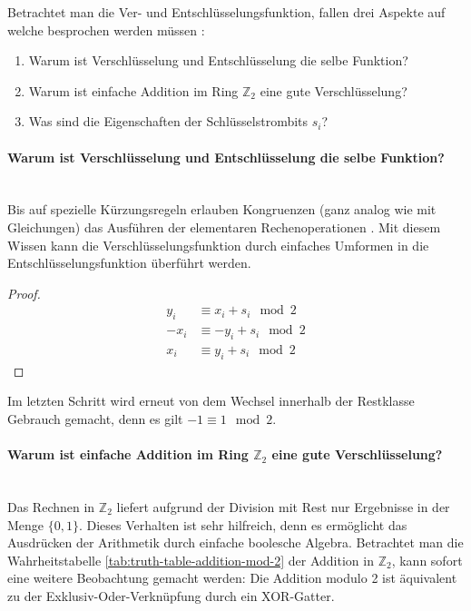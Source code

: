 \noindent
Betrachtet man die Ver- und Entschlüsselungsfunktion, fallen drei Aspekte auf welche
besprochen werden müssen \parencite[31-34]{BOOK:crypto}:

\begin{enumerate}[itemsep = 0pt]
  \item Warum ist Verschlüsselung und Entschlüsselung die selbe Funktion?
  \item Warum ist einfache Addition im Ring $\mathbb{Z}_2$ eine gute Verschlüsselung?
  \item Was sind die Eigenschaften der Schlüsselstrombits $s_i$?
\end{enumerate}

\paragraph{Warum ist Verschlüsselung und Entschlüsselung die selbe Funktion?}\mbox{}\\
Bis auf spezielle Kürzungsregeln erlauben Kongruenzen (ganz analog wie mit Gleichungen)
das Ausführen der elementaren Rechenoperationen \parencite[181-183]{BOOK:numberTheory}.
Mit diesem Wissen kann die Verschlüsselungsfunktion durch einfaches Umformen in die
Entschlüsselungsfunktion überführt werden.
\begin{proof}
  \begin{align*}
    y_i  & \equiv x_i + s_i \mod{2}  \\
    -x_i & \equiv -y_i + s_i \mod{2} \\
    x_i  & \equiv y_i + s_i \mod{2}
  \end{align*}
\end{proof}
\noindent
Im letzten Schritt wird erneut von dem Wechsel innerhalb der Restklasse Gebrauch gemacht,
denn es gilt $-1 \equiv 1 \mod{2}$.

\paragraph{Warum ist einfache Addition im Ring $\mathbb{Z}_2$ eine gute Verschlüsselung?}\mbox{}\\
Das Rechnen in $\mathbb{Z}_2$ liefert aufgrund der Division mit Rest nur Ergebnisse in
der Menge $\{0,1\}$. Dieses Verhalten ist sehr hilfreich, denn es ermöglicht das Ausdrücken der
Arithmetik durch einfache boolesche Algebra.
Betrachtet man die Wahrheitstabelle \ref{tab:truth-table-addition-mod-2}
der Addition in $\mathbb{Z}_2$, kann sofort eine weitere Beobachtung gemacht werden:
Die Addition modulo 2 ist äquivalent zu der Exklusiv-Oder-Verknüpfung durch ein XOR-Gatter.

